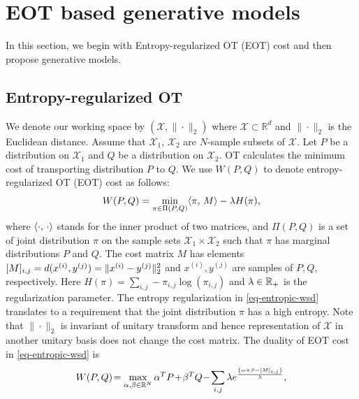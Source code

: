 \section{EOT based generative models}

In this section, we begin with Entropy-regularized OT (EOT) cost and then propose generative models.

\subsection{Entropy-regularized OT} 

We denote our working space by $(\mathcal{X},\|\cdot\|_2)$ where
$\mathcal{X}\subset\mathbb{R}^d$ and $\|\cdot\|_2$ is the Euclidean
distance. Assume that $\mathcal{X}_1$, $\mathcal{X}_2$ are $N$-sample
subsets of $\mathcal{X}$. Let $P$ be a distribution on $\mathcal{X}_1$
and $Q$ be a distribution on $\mathcal{X}_2$. OT calculates the
minimum cost of transporting distribution $P$ to $Q$. We use $W(P,Q)$ to denote entropy-regularized OT (EOT) cost as follows:\vspace{-2pt}
\begin{equation}\label{eq-entropic-wsd}
  W(P,Q)=\min_{ \pi \in \Pi(P,Q)} \dotp{\pi}{M} - \la H(\pi),\vspace{-2pt}
\end{equation}
where $\langle \cdot,\,\cdot\rangle$ stands for the inner product of
two matrices, and $\Pi(P,Q)$ is a set of joint distribution $\pi$ on
the sample sets $\mathcal{X}_1\times\mathcal{X}_2$ such that $\pi$ has
marginal distributions $P$ and $Q$. 
The cost matrix $M$ has elements $[M]_{i,j} = d(x^{(i)}, y^{(j)}) = \| x^{(i)} - y^{(j)} \|_{2}^2$ and $x^{(i)}, y^{(j)}$ are
samples of $P, Q$, respectively. Here $H(\pi) = \sum_{i,j} -\pi_{i,j}
\log(\pi_{i,j})$ and $\lambda \in \mathbb{R}_{+}$ is the regularization
parameter. The entropy regularization in \eqref{eq-entropic-wsd}  translates 
to a requirement that the joint distribution $\pi$ has a high entropy. 
Note that $\|\cdot\|_2$ is invariant of unitary transform and hence
representation of $\mathcal{X}$ in another unitary basis does not
change the cost matrix. The duality of EOT cost in \eqref{eq-entropic-wsd} is\vspace{-2pt}
\begin{equation}\label{eq-dual-wsd}
  W(P,Q) \! =  \max_{\al, \be \in \mathbb{R}^{N}} \al^{T}P \! + \! \beta^{T}Q \! - \!
  \sum_{i,j} \lambda e^{ \frac{{\left( \al + \beta - [M]_{i,j} \right)}}{\la} },\vspace{-2pt}
\end{equation}
